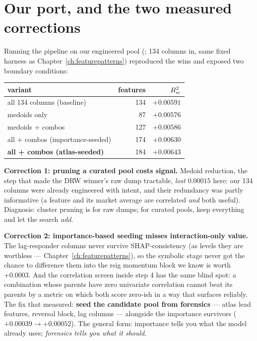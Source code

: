 \section{Our port, and the two measured corrections}
\label{sec:selpitfalls}

Running the pipeline on our engineered pool
(; 134 columns in, same fixed harness as
Chapter~\ref{ch:featurepatterns}) reproduced the wins and exposed two
boundary conditions:

\begin{center}
\begin{tabular}{@{}lrr@{}}
\toprule
variant & features & $R^2_{w}$ \\
\midrule
all 134 columns (baseline) & 134 & $+0.00591$ \\
medoids only & 87 & $+0.00576$ \\
medoids + combos & 127 & $+0.00586$ \\
all + combos (importance-seeded) & 174 & $+0.00630$ \\
\textbf{all + combos (atlas-seeded)} & 184 & $\bm{+0.00643}$ \\
\bottomrule
\end{tabular}
\end{center}

\textbf{Correction 1: pruning a curated pool costs signal.} Medoid
reduction, the step that made the DRW winner's raw dump tractable,
\emph{lost} $0.00015$ here: our 134 columns were already engineered with
intent, and their redundancy was partly informative (a feature and its
market average are correlated \emph{and} both useful). Diagnosis: cluster
pruning is for raw dumps; for curated pools, keep everything and let the
search \emph{add}.

\textbf{Correction 2: importance-based seeding misses interaction-only
value.} The lag-responder columns never survive SHAP-consistency (as
levels they are worthless --- Chapter~\ref{ch:featurepatterns}), so the
symbolic stage never got the chance to difference them into the rsig
momentum block we know is worth $+0.0003$. And the correlation screen
inside step 4 has the same blind spot: a combination whose parents have
zero univariate correlation cannot beat its parents by a metric on which
both score zero-ish in a way that surfaces reliably. The fix that
measured: \textbf{seed the candidate pool from forensics} --- atlas lead
features, reversal block, lag columns --- alongside the importance
survivors ($+0.00039 \to +0.00052$). The general form: importance tells
you what the model already uses; \emph{forensics tells you what it
should}.

